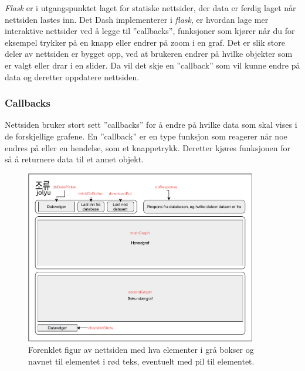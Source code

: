 \textit{Flask} er i utgangspunktet laget for statiske nettsider, der data er ferdig laget når nettsiden lastes inn. 
Det Dash implementerer i \textit{flask}, er hvordan lage mer interaktive nettsider ved å legge til ''callbacks'', funksjoner som kjører når du for eksempel trykker på en knapp eller endrer på zoom i en graf.
Det er slik store deler av nettsiden er bygget opp, ved at brukeren endrer på hvilke objekter som er valgt eller drar i en slider. 
Da vil det skje en ''callback'' som vil kunne endre på data og deretter oppdatere nettsiden. 



\subsubsection{Callbacks}\label{sec:impl:nettside:callback}

Nettsiden bruker stort sett ''callbacks'' for å endre på hvilke data som skal vises i de forskjellige grafene. 
En ''callback'' er en type funksjon som reagerer når noe endres på eller en hendelse, som et knappetrykk. 
Deretter kjøres funksjonen for så å returnere data til et annet objekt. 

\begin{figure}[!htbp]
    \centering
    \includegraphics[width=0.9\textwidth]{implementering/nettside/NettsideEnkel.pdf}
    \caption{Forenklet figur av nettsiden med hva elementer i grå bokser og navnet til elementet i rød teks, eventuelt med pil til elementet.}
    \label{fig:impl:nettside:forenkletNettside}
\end{figure}

